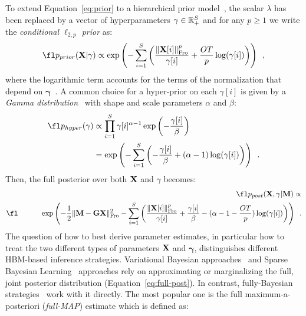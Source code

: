 To extend Equation~\eqref{eq:prior} to a hierarchical prior model~\cite{mackay2003information}, the scalar $\lambda$ has been replaced by a vector of hyperparameters $\mathbf{\gamma} \in \mathbb{R}^{S}_+$ and for any $p \geq 1$ we write the \emph{conditional $\ell_{2,p}$ prior} as:
\begin{equation} \label{eq:condprior}
\fl \hiprior
\propto \exp \left( - \sum_{i=1}^S \left( \frac{\fronorm{\bfX[i]}^p}{\mathbf{\gamma}[i]} + \frac{O T}{p} \log(\mathbf{\gamma}[i])\right)\right) \enspace,
\end{equation}
where the logarithmic term accounts for the terms of the normalization that depend on $\mathbf{\gamma}$~\cite{Lu14}. A common choice for a hyper-prior on each $\gamma[i]$ is given by a \emph{Gamma distribution}~\cite{mackay2003information,KaSo05,CaHaPuSo09,Lucka-etal:2012} with shape and scale parameters $\alpha$ and $\beta$:
\begin{align} \label{eq:hyper}
\fl \hyper & \propto \prod_{i=1}^S \mathbf{\gamma}[i]^{\alpha - 1} \exp \left(- \frac{\mathbf{\gamma}[i]}{\beta} \right) \\
& = \exp \left( - \sum_{i=1}^S \left( - \frac{\mathbf{\gamma}[i]}{\beta} + (\alpha - 1) \log(\mathbf{\gamma}[i]) \right) \right) \enspace.
\end{align}
Then, the full posterior over both $\mathbf{X}$ and $\gamma$ becomes:
\begin{eqnarray}
\label{eq:full-post}
\fl \hipost \propto \nonumber \\
\fl \hspace{3em} \exp \left( - \frac{1}{2} \fronormsq{\bfM - \bfG \bfX} - \sum_{i=1}^S \left( \frac{\fronorm{\bfX[i]}^p}{\mathbf{\gamma}[i]} + \frac{\mathbf{\gamma}[i]}{\beta} - (\alpha - 1 - \frac{OT}{p}) \log(\mathbf{\gamma}[i]) \right) \right)\enspace.
\end{eqnarray}
The question of how to best derive parameter estimates, in particular how to treat the two different types of parameters $\mathbf{X}$ and $\mathbf{\gamma}$, distinguishes different HBM-based inference strategies. Variational Bayesian approaches~\cite{mackay2003information,jordan1999introduction,sato2004hierarchical,FrHaDaKiPhTrHeFlMa08,shervashidze2015learning} and Sparse Bayesian Learning~\cite{tipping2001sparse,wipf2004sparse,Wipf-Nagarajan:2009,zhang-rao:2011} approaches rely on approximating or marginalizing the full, joint posterior distribution (Equation~\eqref{eq:full-post}). In contrast, fully-Bayesian strategies~\cite{CaHaPuSo09,Lucka-etal:2012} work with it directly. The most popular one is the full maximum-a-posteriori (\emph{full-MAP}) estimate which is defined as:

